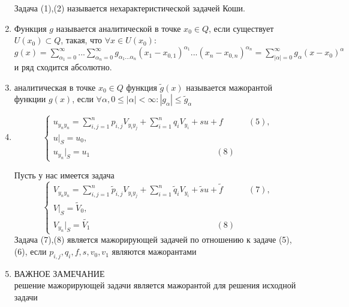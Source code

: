 \documentclass[a4paper,12pt]{article}
\newcommand {\AL} {\alpha}
\newcommand {\LS} {\sum\limits}
\begin{document}
\begin{enumerate}
Задача (1),(2) называется нехарактеристической задачей Коши.


\item Функция $g$ называется аналитической в точке $x_0\in Q$, если существует $U(x_0)\subset Q$, такая, что $\forall x \in U(x_0): $\\$g(x) = \LS_{\AL_1=0}^\infty ... \LS_{\AL_n=0}^\infty g_{\AL_1 ... \AL_n} (x_1 - x_{0,1})^{\AL_1} ... (x_n - x_{0,n})^{\AL_n} = \LS_{|\AL|=0}^\infty g_\AL (x-x_0)^\AL$ и ряд сходится абсолютно.

\item аналитическая в точке $x_0\in Q$ функция $\widetilde{g}(x)$ называется мажорантой функции $g(x)$, если $\forall \AL, 0 \leq |\AL|< \infty: |g_\AL| \leq \widetilde{g}_\AL$

\item 
\begin{equation*}
 \begin{cases}
   u_{y_ny_n} = \LS_{i,j=1}^n {p}_{i,j} V_{y_iy_j}+\LS_{i=1}^n{q}_iV_{y_i} + {s}u + {f} \quad\quad\quad(5),
   \\
	u|_S = {u_0},
	\\
	u_{y_n}|_S = {{u_1}}\quad\quad\quad\quad\quad\quad\quad\quad\quad\quad\quad\quad\quad\quad\quad(8)
 \end{cases}
\end{equation*}

Пусть у нас имеется задача
\begin{equation*}
 \begin{cases}
   V_{y_ny_n} = \LS_{i,j=1}^n \widetilde{p}_{i,j} V_{y_iy_j}+\LS_{i=1}^n\widetilde{q}_iV_{y_i} + \widetilde{s}u + \widetilde{f} \quad\quad\quad(7),
   \\
	V|_S = \widetilde{V}_0,
	\\
	V_{y_n}|_S = \widetilde{{V_1}}\quad\quad\quad\quad\quad\quad\quad\quad\quad\quad\quad\quad\quad\quad\quad(8)
 \end{cases}
\end{equation*}
Задача (7),(8) является мажорирующей задачей по отношению к задаче (5),(6), если $p_{i,j}, q_i, f, s, v_0, v_1$ являются мажорантами
\item ВАЖНОЕ ЗАМЕЧАНИЕ\\
решение мажорирующей задачи является мажорантой для решения исходной задачи


\end{enumerate}
\end{document}
